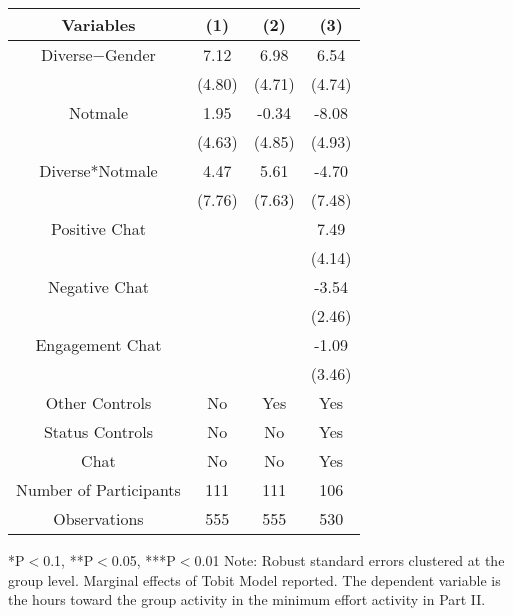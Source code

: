 \begin{table}[htbp]
    \begin{tabular}{c c c c}
    \toprule
    \textbf{Variables} & \textbf{(1)} & \textbf{(2)} & \textbf{(3)}       \\ 
\midrule
Diverse$-$Gender            &     7.12    &    6.98                               &  6.54  \\
                            &     (4.80)  &    (4.71)                             &  (4.74) \\

Notmale                  &      1.95  &    -0.34                            &  -8.08  \\
                            &      (4.63)  &    (4.85)                        &  (4.93) \\
Diverse*Notmale         &      4.47      &  5.61                            &  -4.70 \\
                            &      (7.76)  &    (7.63)                     &  (7.48) \\


Positive Chat                        &                     &                       &  7.49  \\
                                 &                     &                           &  (4.14)  \\
Negative  Chat                       &                     &                       &  -3.54  \\
                                 &                     &                           &  (2.46)  \\
Engagement Chat                      &                     &                       &  -1.09  \\
                                 &                     &                           &  (3.46)  \\
\midrule
Other Controls   &   No &  Yes &    Yes    \\
Status Controls &   No  &    No    &    Yes    \\
Chat          &    No    &    No   &    Yes          \\
\midrule
Number of Participants & 111   &    111 &    106    \\
\midrule
Observations          &   555   &  555  &  530         \\
\bottomrule

\end{tabular}
\begin{footnotesize}
\newline
*P$<$0.1, **P$<$0.05, ***P$<$0.01
\newline
Note: Robust standard errors clustered at the group level. Marginal effects of Tobit Model reported. 
\newline
The dependent variable is the hours toward the group activity in the minimum effort activity in Part II. 
\end{footnotesize}
\end{table}
